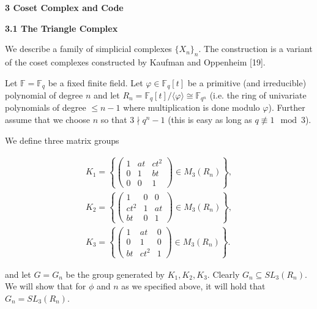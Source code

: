 \par\medskip\noindent\textbf{
3 Coset Complex and Code}\par




\par\medskip\noindent\textbf{
3.1 The Triangle Complex}\par




We describe a family of simplicial complexes $\{X_{n}\}_{n}$.
The construction is a variant of the coset complexes constructed by Kaufman and Oppenheim [19].\par




Let $\mathbb{F}=\mathbb{F}_{q}$ be a fixed finite field. Let $\varphi\in\mathbb{F}_{q}[t]$ be a primitive (and irreducible) polynomial of degree $n$ and let  $R_{n}=\mathbb{F}_{q}[t]/\langle\varphi\rangle\cong\mathbb{F}_{q^{n}}$ (i.e. the ring of univariate polynomials of degree $\leq n-1$ where multiplication is done modulo $\varphi$). Further assume that we choose $n$ so that $3\nmid q^{n}-1$ (this is easy as long as $q\not\equiv 1\mod 3$).\par




We define three matrix groups\par


\[\begin{gathered}
\displaystyle K_{1}=\left\{\begin{pmatrix}1&at&ct^{2}\\
0&1&bt\\
0&0&1\end{pmatrix}\in M_{3}(R_{n})\right\}, \\
\displaystyle K_{2}=\left\{\begin{pmatrix}1&0&0\\
ct^{2}&1&at\\
bt&0&1\end{pmatrix}\in M_{3}(R_{n})\right\}, \\
\displaystyle K_{3}=\left\{\begin{pmatrix}1&at&0\\
0&1&0\\
bt&ct^{2}&1\end{pmatrix}\in M_{3}(R_{n})\right\}.
\end{gathered}\]


and let $G=G_{n}$ be the group generated by $K_{1},K_{2},K_{3}$.
Clearly $G_{n}\subseteq SL_{3}(R_{n})$. We will show that for $\phi$ and $n$ as we specified above, it will hold that $G_{n}=SL_{3}(R_{n})$.\par





